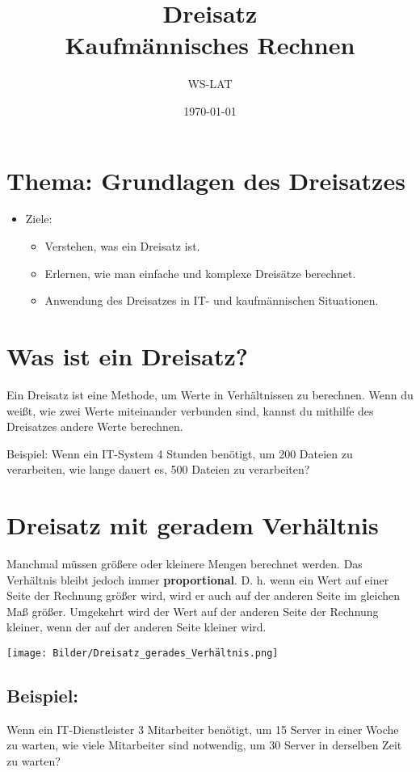 \documentclass{orgstandard}
\author{WS-LAT}
\date{\today}
\title{Dreisatz\\\medskip
\large Kaufmännisches Rechnen}
\begin{document}
\maketitle


\section{Thema: Grundlagen des Dreisatzes}
\label{sec:org1297c27}


\begin{itemize}
\item Ziele:
\begin{itemize}
\item Verstehen, was ein Dreisatz ist.
\item Erlernen, wie man einfache und komplexe Dreisätze berechnet.
\item Anwendung des Dreisatzes in IT- und kaufmännischen Situationen.
\end{itemize}
\end{itemize}

\section{Was ist ein Dreisatz?}
\label{sec:org6b36070}

Ein Dreisatz ist eine Methode, um Werte in Verhältnissen zu berechnen. Wenn du weißt, wie zwei Werte miteinander verbunden sind, kannst du mithilfe des Dreisatzes andere Werte berechnen.

Beispiel: Wenn ein IT-System 4 Stunden benötigt, um 200 Dateien zu verarbeiten, wie lange dauert es, 500 Dateien zu verarbeiten?

\section{Dreisatz mit geradem Verhältnis}
\label{sec:org37307e4}
Manchmal müssen größere oder kleinere Mengen berechnet werden. Das Verhältnis bleibt jedoch immer \textbf{proportional}. D. h. wenn ein Wert auf einer Seite der Rechnung größer wird, wird er auch auf der anderen Seite im gleichen Maß größer. Umgekehrt wird der Wert auf der anderen Seite der Rechnung kleiner, wenn der auf der anderen Seite kleiner wird.

\begin{center}
\texttt{[image: Bilder/Dreisatz\_gerades\_Verhältnis.png]}
\end{center}

\subsection{Beispiel:}
\label{sec:org9e08fe7}
Wenn ein IT-Dienstleister 3 Mitarbeiter benötigt, um 15 Server in einer Woche zu warten, wie viele Mitarbeiter sind notwendig, um 30 Server in derselben Zeit zu warten?
\end{document}

